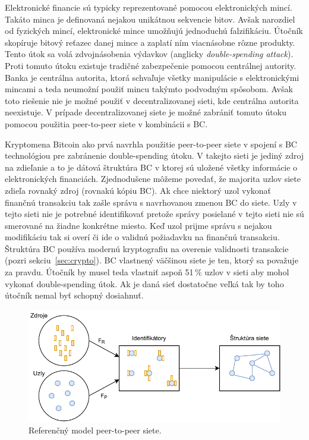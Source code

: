Elektronické financie sú typicky reprezentované pomocou elektronických mincí. Takáto minca je definovaná nejakou unikátnou sekvencie bitov. Avšak narozdiel od fyzických mincí, elektronické mince umožňujú jednoduchú falzifikáciu. Útočník skopíruje bitový reťazec danej mince a zaplatí ním viacnásobne rôzne produkty. Tento útok sa volá zdvojnásobenia výdavkov (anglicky \textit{double-spending attack}). Proti tomuto útoku existuje tradičné zabezpečenie pomocou centrálnej autority. Banka je centrálna autorita, ktorá schvaľuje všetky manipulácie s elektronickými mincami a teda neumožní použiť mincu takýmto podvodným spôsobom. Avšak toto riešenie nie je možné použiť v decentralizovanej sieti, kde centrálna autorita neexistuje. V prípade decentralizovanej siete je možné zabrániť tomuto útoku pomocou použitia peer-to-peer siete v kombinácii s BC.~\cite{doubleSpending}

Kryptomena Bitcoin ako prvá navrhla použitie peer-to-peer siete v spojení s BC technológiou pre zabránenie double-spending útoku. V takejto sieti je jediný zdroj na zdieľanie a to je dátová štruktúra BC v ktorej sú uložené všetky informácie o elektronických financiách. Zjednodušene môžeme povedať, že majorita uzlov siete zdieľa rovnaký zdroj (rovnakú kópiu BC). Ak chce niektorý uzol vykonať finančnú transakciu tak zašle správu s navrhovanou zmenou BC do siete. Uzly v tejto sieti nie je potrebné identifikovať pretože správy posielané v tejto sieti nie sú smerované na žiadne konkrétne miesto. Keď uzol prijme správu s nejakou modifikáciu tak si overí či ide o validnú požiadavku na finančnú transakciu. Štruktúra BC používa modernú kryptografiu na overenie validnosti transakcie (pozri sekciu~\ref{sec:crypto}). BC vlastnený väčšinou siete je ten, ktorý sa považuje za pravdu. Útočník by musel teda vlastniť aspoň 51\,\% uzlov v sieti aby mohol vykonať double-spending útok. Ak je daná sieť dostatočne veľká tak by toho útočník nemal byť schopný dosiahnuť.~\cite{satoshiBitcoin}

\begin{figure}[bt]
	\centering
	\includegraphics[width=\textwidth]{obrazky-figures/p2p-ref-model.pdf}
	\caption{Referenčný model peer-to-peer siete.~\cite{p2pEssence}}
	\label{img:p2p-ref-model}
\end{figure}

